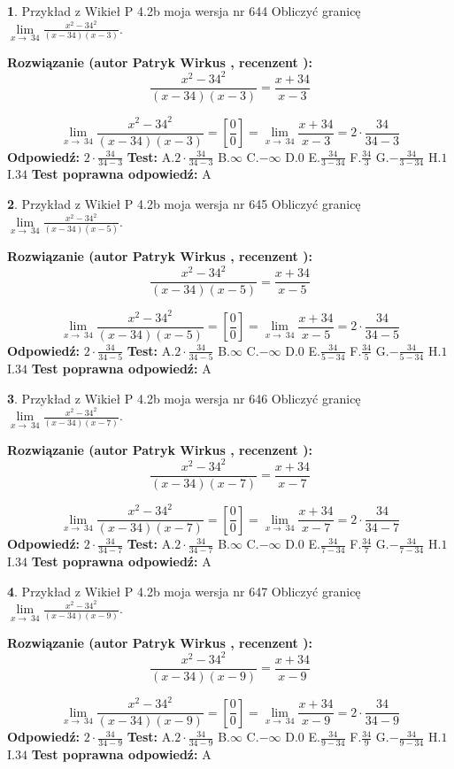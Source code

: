 \documentclass[12pt, a4paper]{article}
\theoremstyle{definition} %
\newtheorem{zad}{}
\newcommand{\zadStart}[1]{\begin{zad}#1\newline}
\newcommand{\zadStop}{\end{zad}}
\newcommand{\rozwStart}[2]{\noindent \textbf{Rozwiązanie (autor #1 , recenzent #2): }\newline}
\newcommand{\rozwStop}{\newline}
\newcommand{\odpStart}{\noindent \textbf{Odpowiedź:}\newline}
\newcommand{\odpStop}{\newline}
\newcommand{\testStart}{\noindent \textbf{Test:}\newline}
\newcommand{\testStop}{\newline}
\newcommand{\kluczStart}{\noindent \textbf{Test poprawna odpowiedź:}\newline}
\newcommand{\kluczStop}{\newline}
\begin{document}
\zadStart{Przykład z Wikieł P 4.2b moja wersja nr 644}
Obliczyć granicę $\lim\limits_{x\to\ 34}\frac{x^{2}-34^{2}}{(x-34)(x-3)}$.
\zadStop
\rozwStart{Patryk Wirkus}{}
$$\frac{x^{2}-34^{2}}{(x-34)(x-3)}=\frac{x+34}{x-3}$$

$$\lim\limits_{x\to\ 34}\frac{x^{2}-34^{2}}{(x-34)(x-3)}=[\frac{0}{0}]=\lim\limits_{x\to\ 34}\frac{x+34}{x-3}=2 \cdot \frac{34}{34-3}$$
\rozwStop
\odpStart
$2 \cdot \frac{34}{34-3}$
\odpStop
\testStart
A.$2 \cdot \frac{34}{34-3}$
B.$\infty$
C.$-\infty$
D.$0$
E.$\frac{34}{3-34}$
F.$\frac{34}{3}$
G.$-\frac{34}{3-34}$
H.$1$
I.$34$
\testStop
\kluczStart
A
\kluczStop



\zadStart{Przykład z Wikieł P 4.2b moja wersja nr 645}
Obliczyć granicę $\lim\limits_{x\to\ 34}\frac{x^{2}-34^{2}}{(x-34)(x-5)}$.
\zadStop
\rozwStart{Patryk Wirkus}{}
$$\frac{x^{2}-34^{2}}{(x-34)(x-5)}=\frac{x+34}{x-5}$$

$$\lim\limits_{x\to\ 34}\frac{x^{2}-34^{2}}{(x-34)(x-5)}=[\frac{0}{0}]=\lim\limits_{x\to\ 34}\frac{x+34}{x-5}=2 \cdot \frac{34}{34-5}$$
\rozwStop
\odpStart
$2 \cdot \frac{34}{34-5}$
\odpStop
\testStart
A.$2 \cdot \frac{34}{34-5}$
B.$\infty$
C.$-\infty$
D.$0$
E.$\frac{34}{5-34}$
F.$\frac{34}{5}$
G.$-\frac{34}{5-34}$
H.$1$
I.$34$
\testStop
\kluczStart
A
\kluczStop



\zadStart{Przykład z Wikieł P 4.2b moja wersja nr 646}
Obliczyć granicę $\lim\limits_{x\to\ 34}\frac{x^{2}-34^{2}}{(x-34)(x-7)}$.
\zadStop
\rozwStart{Patryk Wirkus}{}
$$\frac{x^{2}-34^{2}}{(x-34)(x-7)}=\frac{x+34}{x-7}$$

$$\lim\limits_{x\to\ 34}\frac{x^{2}-34^{2}}{(x-34)(x-7)}=[\frac{0}{0}]=\lim\limits_{x\to\ 34}\frac{x+34}{x-7}=2 \cdot \frac{34}{34-7}$$
\rozwStop
\odpStart
$2 \cdot \frac{34}{34-7}$
\odpStop
\testStart
A.$2 \cdot \frac{34}{34-7}$
B.$\infty$
C.$-\infty$
D.$0$
E.$\frac{34}{7-34}$
F.$\frac{34}{7}$
G.$-\frac{34}{7-34}$
H.$1$
I.$34$
\testStop
\kluczStart
A
\kluczStop



\zadStart{Przykład z Wikieł P 4.2b moja wersja nr 647}
Obliczyć granicę $\lim\limits_{x\to\ 34}\frac{x^{2}-34^{2}}{(x-34)(x-9)}$.
\zadStop
\rozwStart{Patryk Wirkus}{}
$$\frac{x^{2}-34^{2}}{(x-34)(x-9)}=\frac{x+34}{x-9}$$

$$\lim\limits_{x\to\ 34}\frac{x^{2}-34^{2}}{(x-34)(x-9)}=[\frac{0}{0}]=\lim\limits_{x\to\ 34}\frac{x+34}{x-9}=2 \cdot \frac{34}{34-9}$$
\rozwStop
\odpStart
$2 \cdot \frac{34}{34-9}$
\odpStop
\testStart
A.$2 \cdot \frac{34}{34-9}$
B.$\infty$
C.$-\infty$
D.$0$
E.$\frac{34}{9-34}$
F.$\frac{34}{9}$
G.$-\frac{34}{9-34}$
H.$1$
I.$34$
\testStop
\kluczStart
A
\kluczStop
\end{document}
